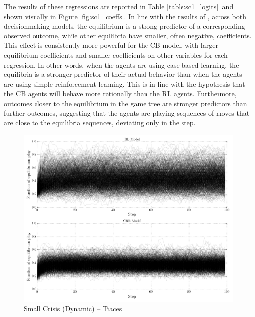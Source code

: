 The results of these regressions are reported in Table \ref{table:sc1_logits}, and shown visually in Figure \ref{fig:sc1_coeffs}. In line with the results of \citet{bennett_2000}, across both decisionmaking models, the equilibrium is a strong predictor of a corresponding observed outcome, while other equilibria have smaller, often negative, coefficients. This effect is consistently more powerful for the CB model, with larger equilibrium coefficients and smaller coefficients on other variables for each regression. In other words, when the agents are using case-based learning, the equilibria is a stronger predictor of their actual behavior than when the agents are using simple reinforcement learning. This is in line with the hypothesis that the CB agents will behave more rationally than the RL agents. Furthermore, outcomes closer to the equilibrium in the game tree are stronger predictors than further outcomes, suggesting that the agents are playing sequences of moves that are close to the equilibria sequences, deviating only in the step.  

\begin{figure}[h!]
	\includegraphics[width=\textwidth]{WarReason/Figures/SC_2_traces}
    \caption{Small Crisis (Dynamic) -- Traces}
    \label{fig:sc2_traces}
    \figSpace
\end{figure}

